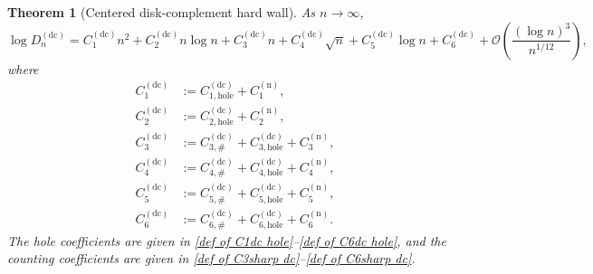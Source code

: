 \documentclass[a4paper]{article}
\newtheorem{theorem}{Theorem}[section]
\numberwithin{equation}{section}
\begin{document}
\begin{theorem}[Centered disk-complement hard wall]
\label{theorem:asymptotic determinant of disk complement}
As $n\to\infty$,
\begin{equation}
\log D_n^{(\mathrm{dc})}
=C_1^{(\mathrm{dc})}n^2
+C_2^{(\mathrm{dc})}n\log n
+C_3^{(\mathrm{dc})}n
+C_4^{(\mathrm{dc})}\sqrt n
+C_5^{(\mathrm{dc})}\log n
+C_6^{(\mathrm{dc})}
+\mathcal O\!\left(\frac{(\log n)^3}{n^{1/12}}\right),
\end{equation}
where
\begin{align}
\label{def of C1 Dn dc}
C_1^{(\mathrm{dc})}
&:=C_{1,\mathrm{hole}}^{(\mathrm{dc})}+C_1^{(\mathrm n)},
\\
\label{def of C2 Dn dc}
C_2^{(\mathrm{dc})}
&:=C_{2,\mathrm{hole}}^{(\mathrm{dc})}+C_2^{(\mathrm n)},
\\
\label{def of C3 Dn dc}
C_3^{(\mathrm{dc})}
&:=C_{3,\#}^{(\mathrm{dc})}+C_{3,\mathrm{hole}}^{(\mathrm{dc})}+C_3^{(\mathrm n)},
\\
\label{def of C4 Dn dc}
C_4^{(\mathrm{dc})}
&:=C_{4,\#}^{(\mathrm{dc})}+C_{4,\mathrm{hole}}^{(\mathrm{dc})}+C_4^{(\mathrm n)},
\\
\label{def of C5 Dn dc}
C_5^{(\mathrm{dc})}
&:=C_{5,\#}^{(\mathrm{dc})}+C_{5,\mathrm{hole}}^{(\mathrm{dc})}+C_5^{(\mathrm n)},
\\
\label{def of C6 Dn dc}
C_6^{(\mathrm{dc})}
&:=C_{6,\#}^{(\mathrm{dc})}+C_{6,\mathrm{hole}}^{(\mathrm{dc})}+C_6^{(\mathrm n)}.
\end{align}
The hole coefficients are given in \eqref{def of C1dc hole}--\eqref{def of C6dc hole}, and the counting coefficients are given in \eqref{def of C3sharp dc}--\eqref{def of C6sharp dc}.
\end{theorem}
\end{document}
